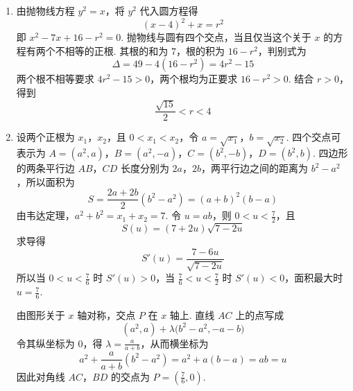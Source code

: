 \begin{solution}
\begin{enumerate}
\item 由抛物线方程 \(y^2=x\)，将 \(y^2\) 代入圆方程得
\[
(x-4)^2+x=r^2
\]
即 \(x^2-7x+16-r^2=0\). 抛物线与圆有四个交点，当且仅当这个关于 \(x\) 的方程有两个不相等的正根. 其根的和为 \(7\)，根的积为 \(16-r^2\)，判别式为
\[
\Delta=49-4(16-r^2)=4r^2-15
\]
两个根不相等要求 \(4r^2-15>0\)，两个根均为正要求 \(16-r^2>0\). 结合 \(r>0\)，得到
\[
\frac{\sqrt{15}}{2}<r<4
\]
\item 设两个正根为 \(x_1\)，\(x_2\)，且 \(0<x_1<x_2\)，令 \(a=\sqrt{x_1}\)，\(b=\sqrt{x_2}\). 四个交点可表示为 \(A=(a^2,a)\)，\(B=(a^2,-a)\)，\(C=(b^2,-b)\)，\(D=(b^2,b)\). 四边形的两条平行边 \(AB\)，\(CD\) 长度分别为 \(2a\)，\(2b\)，两平行边之间的距离为 \(b^2-a^2\)，所以面积为
\[
S=\frac{2a+2b}{2}(b^2-a^2)=(a+b)^2(b-a)
\]
由韦达定理，\(a^2+b^2=x_1+x_2=7\). 令 \(u=ab\)，则 \(0<u<\frac{7}{2}\)，且
\[
S(u)=(7+2u)\sqrt{7-2u}
\]
求导得
\[
S'(u)=\frac{7-6u}{\sqrt{7-2u}}
\]
所以当 \(0<u<\frac{7}{6}\) 时 \(S'(u)>0\)，当 \(\frac{7}{6}<u<\frac{7}{2}\) 时 \(S'(u)<0\)，面积最大时 \(u=\frac{7}{6}\).

由图形关于 \(x\) 轴对称，交点 \(P\) 在 \(x\) 轴上. 直线 \(AC\) 上的点写成
\[
(a^2,a)+\lambda\bigl(b^2-a^2,-a-b\bigr)
\]
令其纵坐标为 \(0\)，得 \(\lambda=\frac{a}{a+b}\)，从而横坐标为
\[
a^2+\frac{a}{a+b}(b^2-a^2)=a^2+a(b-a)=ab=u
\]
因此对角线 \(AC\)，\(BD\) 的交点为 \(P=\left(\frac{7}{6},0\right)\).
\end{enumerate}
\end{solution}
